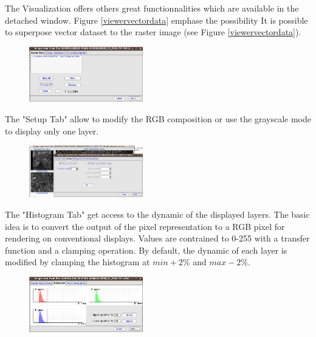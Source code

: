 The Visualization offers others great functionnalities which are available in the detached window.
Figure \ref{viewervectordata} emphase the possibility It is possible to superpose vector dataset
to the raster image (see Figure \ref{viewervectordata}).

\begin{figure}
  \center
  \includegraphics[width=0.44\textwidth]{../Art/MonteverdiImages/monteverdi_viewer_vector_data.png}
  \label{fig:viewervectordata}
\end{figure}

The "Setup Tab" allow to modify the RGB composition or use the grayscale mode to display only one layer. 

\begin{figure}
  \center
  \includegraphics[width=0.44\textwidth]{../Art/MonteverdiImages/monteverdi_viewer_rgb_composition.png}
  \label{fig:rgbcomposition}
\end{figure}

The "Histogram Tab" get access to the dynamic of the displayed layers. The basic idea is to convert the output of the 
pixel representation to a RGB pixel for rendering on conventional displays. 
Values are contrained to 0-255 with a transfer function and a clamping operation.
By default, the dynamic of each layer is modified by
clamping the histogram at $min + 2\%$ and $max - 2\%$. 

\begin{figure}
  \center
  \includegraphics[width=0.44\textwidth]{../Art/MonteverdiImages/monteverdi_viewer_histogram.png}
  \label{fig:histogram}
\end{figure}


